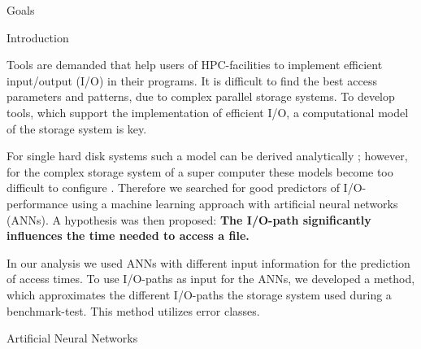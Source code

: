 \documentclass[final]{beamer}
\newlength{\onecolwid}
\begin{document}
\begin{frame}[t]
\begin{columns}[t]
\begin{column}{\onecolwid}
\begin{alertblock}{Goals}
\end{alertblock}


\begin{block}{Introduction}
	
Tools are demanded that help users of HPC-facilities to implement efficient input/output (I/O) in their programs.
It is difficult to find the best access parameters and patterns, due to complex parallel storage systems.
To develop tools, which support the implementation of efficient I/O, a computational model of the storage system is key.\medskip

For single hard disk systems such a model can be derived analytically \cite{Ruemmler94anintroduction}; however, for the complex storage system of a super computer these models become too difficult to configure \cite{DBLP:conf/npc/ZhangLZJC10}.
Therefore we searched for good predictors of I/O-performance using a machine learning approach with artificial neural networks (ANNs).
A hypothesis was then proposed: \textbf{The I/O-path significantly influences the time needed to access a file.}\medskip

In our analysis we used ANNs with different input information for the prediction of access times.
To use I/O-paths as input for the ANNs, we developed a method, which approximates the different I/O-paths the storage system used during a benchmark-test.
This method utilizes error classes.

\end{block}




\begin{block}{Artificial Neural Networks}
		

\end{block}
\end{column}
\end{columns}
\end{frame}
\end{document}
